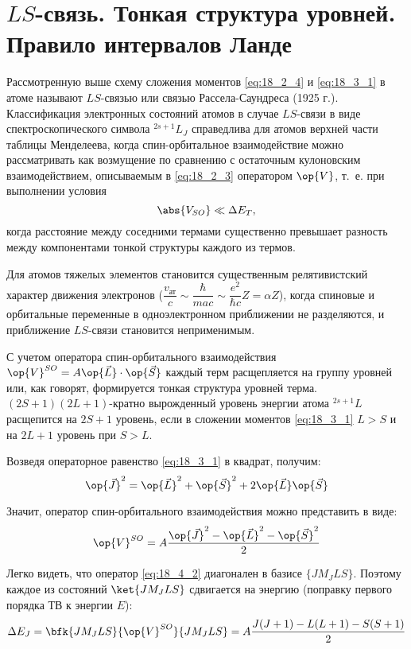 \section{$LS$-связь. Тонкая структура уровней. Правило интервалов Ланде}

Рассмотренную выше схему сложения моментов \eqref{eq:18_2_4} и \eqref{eq:18_3_1} в атоме называют $LS$-связью  или связью Рассела-Саундреса (1925 г.). Классификация электронных состояний атомов в случае $LS$-связи в виде спектроскопического символа $^{2s+1}L_J$ справедлива для атомов верхней части таблицы Менделеева, когда спин-орбитальное взаимодействие можно рассматривать как возмущение по сравнению с остаточным кулоновским взаимодействием, описываемым в \eqref{eq:18_2_3} оператором $\op{V}$, т.~е. при выполнении условия
\begin{equation}
\label{eq:18_4_1}
\abs{V_{SO}} \ll \Delta E_T,
\end{equation}
когда расстояние между соседними термами существенно превышает разность между компонентами тонкой структуры каждого из термов.
 
Для атомов тяжелых элементов становится существенным релятивистский характер движения электронов ($\dfrac{v_{\text{ат}}}{c} \sim \dfrac{\hbar}{m a c} \sim \dfrac{e^2}{\hbar c} Z = \alpha Z$), когда спиновые и орбитальные переменные в одноэлектронном приближении не разделяются, и приближение $LS$-связи становится неприменимым.

С учетом оператора спин-орбитального взаимодействия $\op{V}^{SO} = A \op{\vec{L}} \cdot \op{\vec{S}}$ каждый терм расщепляется на группу уровней или, как говорят, формируется тонкая структура уровней терма. $(2S + 1)(2L+1)$-кратно вырожденный уровень энергии атома $^{2s+1}L$ расщепится на $2S+1$ уровень, если в сложении моментов \eqref{eq:18_3_1} $L > S$ и на $2L+1$ уровень при $S > L$. 

Возведя операторное равенство \eqref{eq:18_3_1} в квадрат, получим:
$$
\op{\vec{J}}^2 = \op{\vec{L}}^2 + \op{\vec{S}}^2 + 2\op{\vec{L}}\op{\vec{S}}
$$

Значит, оператор спин-орбитального взаимодействия можно представить в виде:
\begin{equation}
\label{eq:18_4_2}
\op{V}^{SO} = A\frac{\op{\vec{J}}^2 - \op{\vec{L}}^2 - \op{\vec{S}}^2}{2}
\end{equation}

Легко видеть, что оператор \eqref{eq:18_4_2} диагонален в базисе $\{ J M_J L S\}$. Поэтому каждое из состояний $\ket{J M_J L S}$ сдвигается на энергию (поправку первого порядка ТВ к энергии $E$):
$$
\Delta E_J = \bfk{J M_J L S}{\op{V}^{SO}}{J M_J L S} = A \frac{J(J+1) - L(L+1) - S(S+1)}{2}
$$

